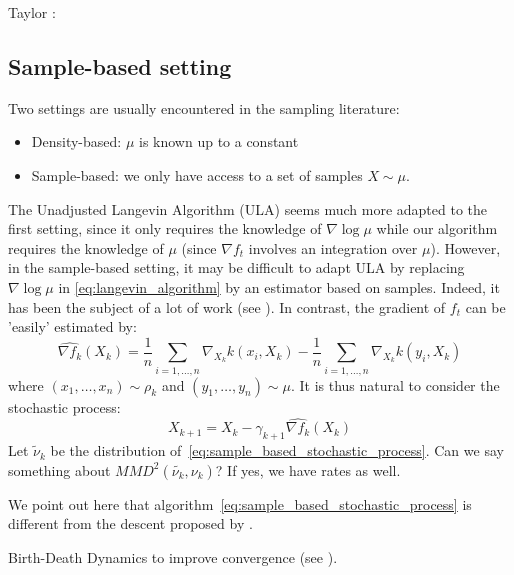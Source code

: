 Taylor : 


\subsection{Sample-based setting}

Two settings are usually encountered in the sampling literature:
\begin{itemize}
	\item Density-based: $\mu$ is known up to a constant
	\item Sample-based: we only have access to a set of samples $X \sim \mu$.
\end{itemize}

The Unadjusted Langevin Algorithm (ULA) seems much more adapted to the first setting, since it only requires the knowledge of $\nabla \log \mu$ while our algorithm requires the knowledge of $\mu$ (since $\nabla f_t$ involves an integration over $\mu$). However, in the sample-based setting, it may be difficult to adapt ULA by replacing $\nabla \log \mu$ in \eqref{eq:langevin_algorithm} by an estimator based on samples. Indeed, it has been the subject of a lot of work (see \cite{li2017gradient}). In contrast, the gradient of $f_t$ can be 'easily' estimated by:
\begin{equation}
\widehat{\nabla f_k}(X_k)=\frac{1}{n}\sum_{i=1,\dots,n}\nabla_{X_k}k(x_i,X_k) - \frac{1}{n}\sum_{i=1,\dots,n}\nabla_{X_k}k(y_i,X_k)
\end{equation}
where $(x_1, \dots, x_n)\sim \rho_k$ and $(y_1, \dots, y_n)\sim \mu$. 
It is thus natural to consider the stochastic process:
\begin{equation}\label{eq:sample_based_stochastic_process}
X_{k+1}=X_k-\gamma_{k+1}\widehat{\nabla f_k}(X_k) 
\end{equation}
Let $\widetilde{\nu}_k$ be the distribution of~\eqref{eq:sample_based_stochastic_process}. Can we say something about $MMD^2(\widetilde{\nu_k}, \nu_k)$? If yes, we have rates as well.

\begin{remark}
	We point out here that algorithm~\eqref{eq:sample_based_stochastic_process} is different from the descent proposed by \cite{mroueh2018regularized}. 
\end{remark}

\begin{remark}
	Birth-Death Dynamics to improve convergence (see \cite{rotskoff2019global}).
\end{remark}
